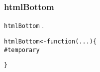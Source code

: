 \documentclass{article}\usepackage[]{graphicx}\usepackage[]{color}
\makeatletter
\newcommand{\hlcom}[1]{\textcolor[rgb]{0.345,0.431,0.459}{#1}}%
\newcommand{\hlstd}[1]{\textcolor[rgb]{0.514,0.58,0.588}{#1}}%
\newcommand{\hlkwa}[1]{\textcolor[rgb]{0.796,0.294,0.086}{#1}}%
\newcommand{\hlkwb}[1]{\textcolor[rgb]{0.522,0.6,0}{#1}}%
\newcommand{\hlkwc}[1]{\textcolor[rgb]{0.796,0.294,0.086}{#1}}%
\newenvironment{kframe}{%
 \def\at@end@of@kframe{}%
 \ifinner\ifhmode%
  \def\at@end@of@kframe{\end{minipage}}%
  \begin{minipage}{\columnwidth}%
 \fi\fi%
 \def\FrameCommand##1{\hskip\@totalleftmargin \hskip-\fboxsep
 \colorbox{shadecolor}{##1}\hskip-\fboxsep
     \hskip-\linewidth \hskip-\@totalleftmargin \hskip\columnwidth}%
 \MakeFramed {\advance\hsize-\width
   \@totalleftmargin\z@ \linewidth\hsize
   \@setminipage}}%
 {\par\unskip\endMakeFramed%
 \at@end@of@kframe}
\newenvironment{knitrout}{}{} %
\makeatother
\begin{document}
\subsubsection{htmlBottom}

\texttt{htmlBottom} .


\begin{knitrout}
\color{fgcolor}\begin{kframe}
\begin{alltt}
\hlstd{htmlBottom} \hlkwb{<-} \hlkwa{function}\hlstd{(}\hlkwc{...}\hlstd{) \{}
    \hlcom{# temporary}











































\hlstd{\}}
\end{alltt}
\end{kframe}
\end{knitrout}
\end{document}
